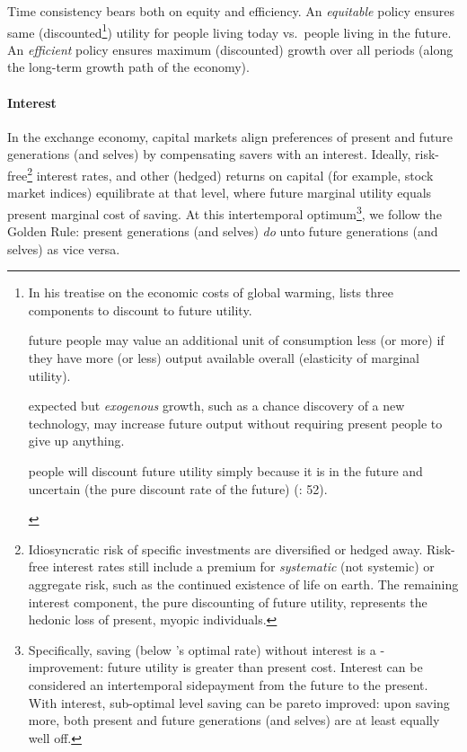 Time consistency bears both on equity and efficiency. An \emph{equitable} policy ensures same (discounted\footnote{
	\label{fn:3components}In his treatise on the economic costs of global warming, \citeauthor{Stern-2006-aa} lists three components to discount to future utility. \begin{inparaenum}[\itshape 1\upshape)]
		\item future people may value an additional unit of consumption less (or more) if they have more (or less) output available overall (elasticity of marginal utility).
		\item expected but \emph{exogenous} growth, such as a chance discovery of a new technology, may increase future output without requiring present people to give up anything.
		\item people will discount future utility simply because it is in the future and uncertain (the pure discount rate of the future) (\citeyear{Stern-2006-aa}: 52).
	\end{inparaenum}})
utility for people living today vs.\ people living in the future. An \emph{efficient} policy ensures maximum (discounted) growth over all periods (along the long-term growth path of the economy). %


\paragraph{Interest}  \label{sec:interest} In the exchange economy, capital markets align preferences of present and future generations (and selves) by compensating savers with an interest. Ideally, risk-free\footnote{
	Idiosyncratic risk of specific investments are diversified or hedged away. Risk-free interest rates still include a premium for \emph{systematic} (not systemic) or aggregate risk, such as the continued existence of life on earth. The remaining interest component, the pure discounting of future utility, represents the hedonic loss of present, myopic individuals.}
interest rates, and other (hedged) returns on capital (for example, stock market indices) equilibrate at that level, where future marginal utility equals present marginal cost of saving. At this intertemporal optimum\footnote{
	Specifically, saving (below \citeauthor{Solow1956}'s optimal rate) without interest is a \citeauthor{Kaldor1939}-\citeauthor{Hicks1939} improvement: future utility is greater than present cost. Interest can be considered an intertemporal sidepayment from the future to the present. With interest, sub-optimal level saving can be pareto improved: upon saving more, both present and future generations (and selves) are at least equally well off.},
we follow the Golden Rule: present generations (and selves) \emph{do} unto future generations (and selves) as vice versa.

